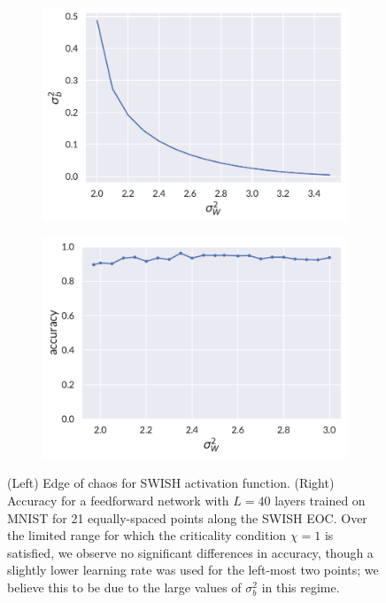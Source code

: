 \begin{figure}[h!]
	\centering
	\begin{subfigure}{0.5\textwidth}
		\centering
		\includegraphics[width=\linewidth]{figures/chapter4/SwishEOC.pdf}
	\end{subfigure}%
	\begin{subfigure}{0.5\textwidth}
		\centering
		\includegraphics[width=\linewidth]{figures/chapter4/Swish_accuracy.pdf}
	\end{subfigure}
	\caption{(Left) Edge of chaos for SWISH activation function. (Right) Accuracy for a feedforward network with $L=40$ layers trained on MNIST for 21 equally-spaced points along the SWISH EOC. Over the limited range for which the criticality condition $\chi=1$ is satisfied, we observe no significant differences in accuracy, though a slightly lower learning rate was used for the left-most two points; we believe this to be due to the large values of $\sigma_b^2$ in this regime. \label{fig:swisheoc}}
\end{figure}

